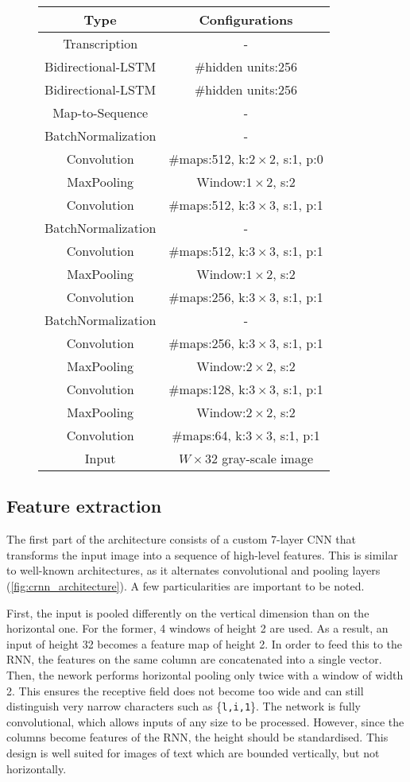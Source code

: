 		\begin{figure}\begin{tabular}{|c|c|}
			\hline
			\textbf{Type} & \textbf{Configurations}						\tabularnewline	\hline
																																				\hline
			Transcription & - 																\tabularnewline	\hline
			Bidirectional-LSTM & \#hidden units:256						\tabularnewline	\hline
			Bidirectional-LSTM & \#hidden units:256						\tabularnewline	\hline
			Map-to-Sequence & - 															\tabularnewline	\hline
			BatchNormalization & - 														\tabularnewline	\hline
			Convolution & \#maps:512, k:$2\times2$, s:1, p:0	\tabularnewline	\hline
			MaxPooling & Window:$1\times2$, s:2								\tabularnewline	\hline
			Convolution & \#maps:512, k:$3\times3$, s:1, p:1	\tabularnewline	\hline
			BatchNormalization & - 														\tabularnewline	\hline
			Convolution & \#maps:512, k:$3\times3$, s:1, p:1	\tabularnewline	\hline
			MaxPooling & Window:$1\times2$, s:2 							\tabularnewline	\hline
			Convolution & \#maps:256, k:$3\times3$, s:1, p:1	\tabularnewline	\hline
			BatchNormalization & - 														\tabularnewline	\hline
			Convolution & \#maps:256, k:$3\times3$, s:1, p:1	\tabularnewline	\hline
			MaxPooling & Window:$2\times2$, s:2								\tabularnewline	\hline
			Convolution & \#maps:128, k:$3\times3$, s:1, p:1	\tabularnewline	\hline
			MaxPooling & Window:$2\times2$, s:2 							\tabularnewline	\hline
			Convolution & \#maps:64, k:$3\times3$, s:1, p:1		\tabularnewline	\hline
			Input & $W\times32$ gray-scale image 							\tabularnewline	\hline
		\end{tabular}\par
		\caption[\CRNN{} architecture]{}\label{fig:crnn_architecture}
		\end{figure}

	\subsection{Feature extraction}
		The first part of the \CRNN{} architecture consists of a custom 7-layer CNN that transforms the input image into a sequence of high-level features. This is similar to well-known architectures, as it alternates convolutional and pooling layers (\autoref{fig:crnn_architecture}). A few particularities are important to be noted.

		First, the input is pooled differently on the vertical dimension than on the horizontal one. For the former, 4 windows of height 2 are used. As a result, an input of height 32 becomes a feature map of height 2. In order to feed this to the RNN, the features on the same column are concatenated into a single vector. Then, the nework performs horizontal pooling only twice with a window of width 2. This ensures the receptive field does not become too wide and can still distinguish very narrow characters such as \{\texttt{l,i,1}\}. The network is fully convolutional, which allows inputs of any size to be processed. However, since the columns become features of the RNN, the height should be standardised. This design is well suited for images of text which are bounded vertically, but not horizontally.

